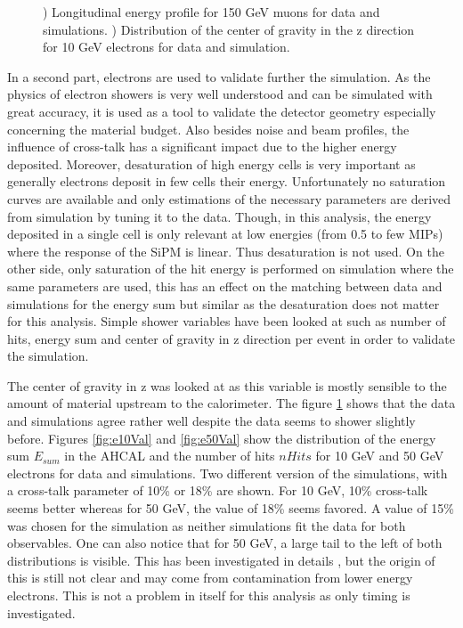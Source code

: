 \begin{figure}[htbp!]
\begin{subfigure}[t]{0.49\textwidth}
    \caption{} \label{fig:e10GoGZ}
  \end{subfigure}
  \caption{) Longitudinal energy profile for 150 GeV muons for data and simulations. ) Distribution of the center of gravity in the z direction for 10 GeV electrons for data and simulation.}
  \label{fig:Val}
\end{figure}

In a second part, electrons are used to validate further the simulation. As the physics of electron showers is very well understood and can be simulated with great accuracy, it is used as a tool to validate the detector geometry especially concerning the material budget. Also besides noise and beam profiles, the influence of cross-talk has a significant impact due to the higher energy deposited. Moreover, desaturation of high energy cells is very important as generally electrons deposit in few cells their energy. Unfortunately no saturation curves are available and only estimations of the necessary parameters are derived from simulation by tuning it to the data. Though, in this analysis, the energy deposited in a single cell is only relevant at low energies (from 0.5 to few MIPs) where the response of the SiPM is linear. Thus desaturation is not used. On the other side, only saturation of the hit energy is performed on simulation where the same parameters are used, this has an effect on the matching between data and simulations for the energy sum but similar as the desaturation does not matter for this analysis. Simple shower variables have been looked at such as number of hits, energy sum and center of gravity in z direction per event in order to validate the simulation.

The center of gravity in z was looked at as this variable is mostly sensible to the amount of material upstream to the calorimeter. The figure \ref{fig:e10GoGZ} shows that the data and simulations agree rather well despite the data seems to shower slightly before. Figures \ref{fig:e10Val} and \ref{fig:e50Val} show the distribution of the energy sum $E_{sum}$ in the AHCAL and the number of hits $nHits$ for 10 GeV and 50 GeV electrons for data and simulations. Two different version of the simulations, with a cross-talk parameter of 10\% or 18\% are shown. For 10 GeV, 10\% cross-talk seems better whereas for 50 GeV, the value of 18\% seems favored. A value of 15\% was chosen for the simulation as neither simulations fit the data for both observables. One can also notice that for 50 GeV, a large tail to the left of both distributions is visible. This has been investigated in details \cite{AmbraEnergy}, but the origin of this is still not clear and may come from contamination from lower energy electrons. This is not a problem in itself for this analysis as only timing is investigated.

